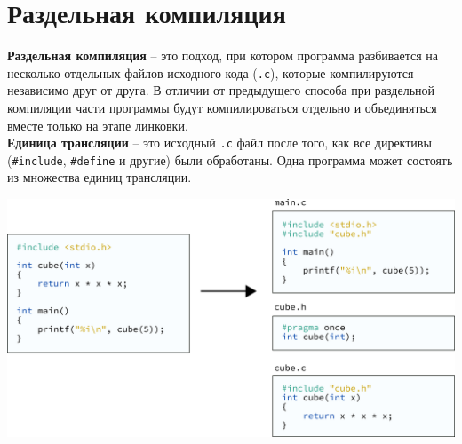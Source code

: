 \documentclass[10pt]{article}
\begin{document}
\newpage
\section*{Раздельная компиляция}

\textbf{Раздельная компиляция} -- это подход, при котором программа разбивается на несколько отдельных файлов исходного кода (\texttt{.c}), которые компилируются независимо друг от друга. В отличии от предыдущего способа при раздельной компиляции части программы будут компилироваться отдельно и объединяться вместе только на этапе линковки. \\
\textbf{Единица трансляции} --  это исходный \texttt{.c} файл после того, как все директивы (\texttt{\#include}, \texttt{\#define} и другие) были обработаны. Одна программа может состоять из множества единиц трансляции.
\begin{center}
\includegraphics[scale=0.9]{../images/main_cube_separate3b.png}
\end{center}
\end{document}
